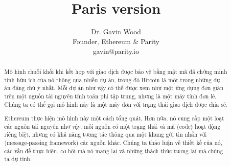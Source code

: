 \documentclass[9pt,oneside]{amsart}
\title[\cTitle \\ \smaller \textbf{{Paris version}}]{
  \cTitle \\ \smaller \textbf{{Paris version \YellowPaperVersionNumber}}
}
\author{
    Dr. Gavin Wood\\
    Founder, Ethereum \& Parity\\
    gavin@parity.io
}
\begin{document}
\pagecolor{pagecolor}

\begin{abstract}
  Mô hình chuỗi khối khi kết hợp với giao dịch được bảo vệ bằng mật mã đã chứng minh tính hữu ích của nó thông qua nhiều dự án, trong đó Bitcoin là một trong những dự án đáng chú ý nhất. Mỗi dự án như vậy có thể được xem như một ứng dụng đơn giản trên một nguồn tài nguyên tính toán phi tập trung, nhưng là một máy tính đơn lẻ. Chúng ta có thể gọi mô hình này là một máy đơn với trạng thái giao dịch được chia sẽ.

  Ethereum thực hiện mô hình này một cách tổng quát. Hơn nữa, nó cung cấp một loạt các nguồn tài nguyên như vậy, mỗi nguồn có một trạng thái và mã (code) hoạt động riêng biệt, nhưng có khả năng tương tác thông qua một khung gửi tin nhắn với (message-passing framework) các nguồn khác. Chúng ta thảo luận về thiết kế của nó, các vấn đề thực hiện, cơ hội mà nó mang lại và những thách thức tương lai mà chúng ta dự tính.
\end{abstract}

\maketitle
\end{document}
